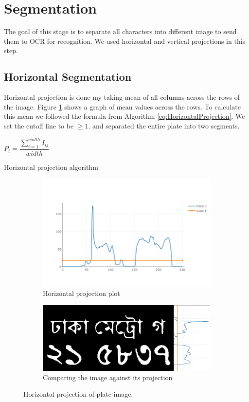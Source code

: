 \documentclass{standalone}
\begin{document}
\section{Segmentation}
The goal of this stage is to separate all characters into different image to send them to OCR for recognition. We used horizontal and vertical projections in this step.


\subsection{Horizontal Segmentation}
Horizontal projection is done my taking mean of all columns across the rows of the image. Figure \ref{fig:HorizontalProjection} shows a graph of mean values across the rows. To calculate this mean we followed the formula from Algorithm \ref{eq:HorizontalProjection}. We set the cutoff line to be $\geq 1$. and separated the entire plate into two segments. 

\begin{algorithm}
  \begin{algorithmic}
        \State $P_i = \dfrac{ \sum^{width}_{i=1}{ I_{ij} } }{ width }$
    \EndFor
  \end{algorithmic}
  \caption{Horizontal projection algorithm}
  \label{eq:HorizontalProjection}
\end{algorithm}

\begin{figure}
\centering
\begin{subfigure}{0.9\textwidth}
  \centering
  \includegraphics[width=0.8\linewidth]{./img/plots/horizontal-1}
  \caption{Horizontal projection plot}
\end{subfigure}
\begin{subfigure}{0.8\textwidth}
  \centering
  \includegraphics[width=0.8\linewidth]{./img/plots/horizontal-2}
  \caption{Comparing the image against its projection}
\end{subfigure}
\caption{Horizontal projection of plate image.}
\label{fig:HorizontalProjection}
\end{figure}
\end{document}
